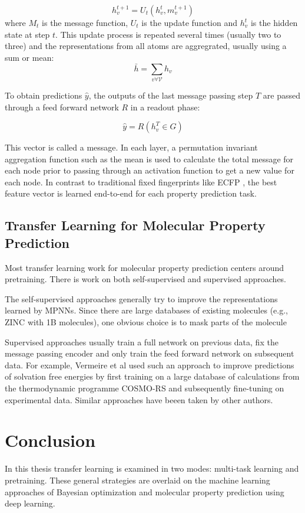 \begin{equation}
    h_v^{t+1} = U_t(h_v^t, m_v^{t+1})
\end{equation}
where $M_t$ is the message function, $U_t$ is the update function and $h_v^{t}$ is the hidden state at step $t$. This update process is repeated several times (usually two to three) and the representations from all atoms are aggregrated, usually using a sum or mean:
\begin{equation}
    \bar h = \sum_{v\forall \mathcal V} h_v
\end{equation}

To obtain predictions $\hat y$, the outputs of the last message passing step $T$ are passed through a feed forward network $R$ in a readout phase:

\begin{equation}
    \hat y = R(h_v^T \in G)
\end{equation}

This  vector is called a message. In each layer, a permutation invariant aggregation function such as the mean is used to calculate the total message for each node prior to passing through an activation function to get a new value for each node.  In contrast to traditional fixed fingerprints like ECFP \cite{Rogers2010}, the best feature vector is learned end-to-end for each property prediction task.

\subsection{Transfer Learning for Molecular Property Prediction}

Most transfer learning work for molecular property prediction centers around pretraining. There is work on both self-supervised and supervised approaches.

The self-supervised approaches generally try to improve the representations learned by MPNNs. Since there are large databases of existing molecules (e.g., ZINC with 1B molecules), one obvious choice is to mask parts of the molecule %

Supervised approaches usually train a full network on previous data, fix the message passing encoder and only train the feed forward network on subsequent data. For example, Vermeire et al used such an approach to improve predictions of solvation free energies by first training on a large database of calculations from the thermodynamic programme COSMO-RS and subsequently fine-tuning on experimental data.\cite{Vermeire2021} Similar approaches have beeen taken by other authors.

\section{Conclusion}

In this thesis transfer learning is examined in two modes: multi-task learning and pretraining. These general strategies are overlaid on the machine learning approaches of Bayesian optimization and molecular property prediction using deep learning. 